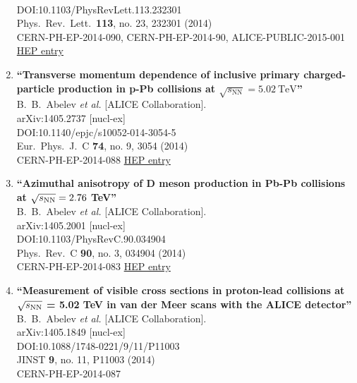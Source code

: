 \begin{enumerate}
  \\{}DOI:10.1103/PhysRevLett.113.232301
  \\{}Phys.\ Rev.\ Lett.\  {\bf 113}, no. 23, 232301 (2014)
  \\{}CERN-PH-EP-2014-090, CERN-PH-EP-2014-90, ALICE-PUBLIC-2015-001
\href{http://inspirehep.net/record/1296081}{HEP entry}
\item%
{\bf ``Transverse momentum dependence of inclusive primary charged-particle production in p-Pb collisions at $\sqrt{s_\mathrm{{NN}}}=5.02~\text {TeV}$''}
  \\{}B.~B.~Abelev {\it et al.} [ALICE Collaboration].
  \\{}arXiv:1405.2737 [nucl-ex]
  \\{}DOI:10.1140/epjc/s10052-014-3054-5
  \\{}Eur.\ Phys.\ J.\ C {\bf 74}, no. 9, 3054 (2014)
  \\{}CERN-PH-EP-2014-088
\href{http://inspirehep.net/record/1295687}{HEP entry}
\item%
{\bf ``Azimuthal anisotropy of D meson production in Pb-Pb collisions at \linebreak $\sqrt{s_{\rm NN}} = 2.76$ TeV''}
  \\{}B.~B.~Abelev {\it et al.} [ALICE Collaboration].
  \\{}arXiv:1405.2001 [nucl-ex]
  \\{}DOI:10.1103/PhysRevC.90.034904
  \\{}Phys.\ Rev.\ C {\bf 90}, no. 3, 034904 (2014)
  \\{}CERN-PH-EP-2014-083
\href{http://inspirehep.net/record/1294938}{HEP entry}
\item%
{\bf ``Measurement of visible cross sections in proton-lead collisions at $\sqrt{s_{\rm NN}}$ = 5.02 TeV in van der Meer scans with the ALICE detector''}
  \\{}B.~B.~Abelev {\it et al.} [ALICE Collaboration].
  \\{}arXiv:1405.1849 [nucl-ex]
  \\{}DOI:10.1088/1748-0221/9/11/P11003
  \\{}JINST {\bf 9}, no. 11, P11003 (2014)
  \\{}CERN-PH-EP-2014-087

\end{enumerate}
